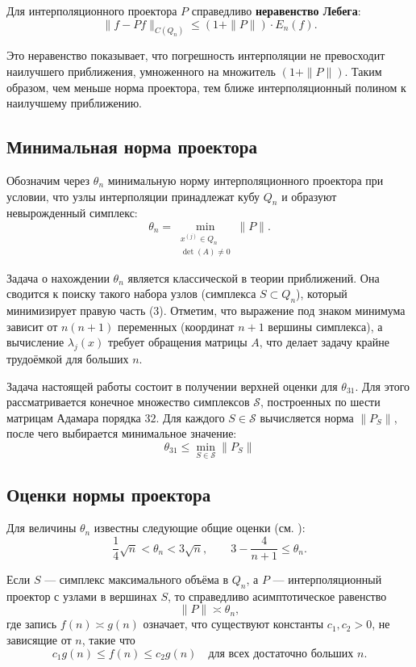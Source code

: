 \documentclass[a4paper,12pt]{article}
\theoremstyle{indented}
\begin{document}
Для интерполяционного проектора $P$ справедливо \textbf{неравенство Лебега}:
\[
\|f - P f\|_{C(Q_n)} \le (1 + \|P\|) \cdot E_n(f). \tag{4}
\]

Это неравенство показывает, что погрешность интерполяции не превосходит наилучшего приближения, умноженного на множитель $(1 + \|P\|)$. Таким образом, чем меньше норма проектора, тем ближе интерполяционный полином к наилучшему приближению.

\subsection{Минимальная норма проектора}

Обозначим через $\theta_n$ минимальную норму интерполяционного проектора при условии, что узлы интерполяции принадлежат кубу $Q_n$ и образуют невырожденный симплекс:
\[
\theta_n = \min_{\substack{x^{(j)} \in Q_n \\ \det(A) \neq 0}} \|P\|.
\]
\par
Задача о нахождении $\theta_n$ является классической в теории приближений. Она сводится к поиску такого набора узлов (симплекса $S \subset Q_n$), который минимизирует правую часть (3). Отметим, что выражение под знаком минимума зависит от $n(n+1)$ переменных (координат $n+1$ вершины симплекса), а вычисление $\lambda_j(x)$ требует обращения матрицы $A$, что делает задачу крайне трудоёмкой для больших $n$.
\par
Задача настоящей работы состоит в получении верхней оценки для $\theta_{31}$. Для этого рассматривается конечное множество симплексов $\mathcal{S}$, построенных по шести матрицам Адамара порядка $32$. Для каждого $S \in \mathcal{S}$ вычисляется норма $\|P_S\|$, после чего выбирается минимальное значение:
\[
\theta_{31} \le \min_{S \in \mathcal{S}} \|P_S\|
\]

\subsection{Оценки нормы проектора}

Для величины $\theta_n$ известны следующие общие оценки (см. \cite{nevsky_geo}):
\[
\frac{1}{4}\sqrt{n} < \theta_n < 3\sqrt{n}, \qquad 3 - \frac{4}{n+1} \le \theta_n.
\]

Если $S$ — симплекс максимального объёма в $Q_n$, а $P$ — интерполяционный проектор с узлами в вершинах $S$, то справедливо асимптотическое равенство
\[
\|P\| \asymp \theta_n,
\]
где запись $f(n) \asymp g(n)$ означает, что существуют константы $c_1, c_2 > 0$, не зависящие от $n$, такие что
\[
c_1 g(n) \le f(n) \le c_2 g(n) \quad \text{для всех достаточно больших } n.
\]
\end{document}
